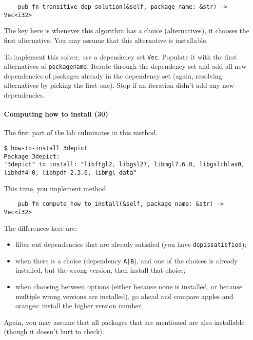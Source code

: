 \documentclass[12pt]{article}
\renewcommand{\_}{\kern-1.5pt\textunderscore\kern-1.5pt}
\begin{document}
\begin{verbatim}
    pub fn transitive_dep_solution(&self, package_name: &str) -> Vec<i32>
\end{verbatim}

The key here is whenever this algorithm has a choice (alternatives), it chooses the first
alternative. You may assume that this alternative is installable.

\vspace{1em}
To implement this solver, use a dependency set \texttt{Vec}. Populate
it with the first alternatives of \texttt{package\_name}. Iterate
through the dependency set and add all new dependencies of packages
already in the dependency set (again, resolving alternatives by
picking the first one). Stop if an iteration didn't add any new
dependencies.



\paragraph{Computing how to install (30)}

The first part of the lab culminates in this method.
{\scriptsize
\begin{verbatim}
$ how-to-install 3depict
Package 3depict:
"3depict" to install: "libftgl2, libgsl27, libmgl7.6.0, libgslcblas0, libhdf4-0, libhpdf-2.3.0, libmgl-data"
\end{verbatim}
}

This time, you implement method
\begin{verbatim}
    pub fn compute_how_to_install(&self, package_name: &str) -> Vec<i32>
\end{verbatim}
The differences here are:
\begin{itemize}
\item filter out dependencies that are already satisfied (you have \texttt{dep\_is\_satisfied});
\item when there is a choice (dependency \texttt{A|B}), and one of the choices is already installed, but the wrong version, then install that choice;
\item when choosing between options (either because none is installed, or because multiple wrong versions are installed), go ahead and compare apples and oranges: install the higher version number.
\end{itemize}
Again, you may assume that all packages that are mentioned are also installable (though it doesn't hurt to check).
\end{document}
